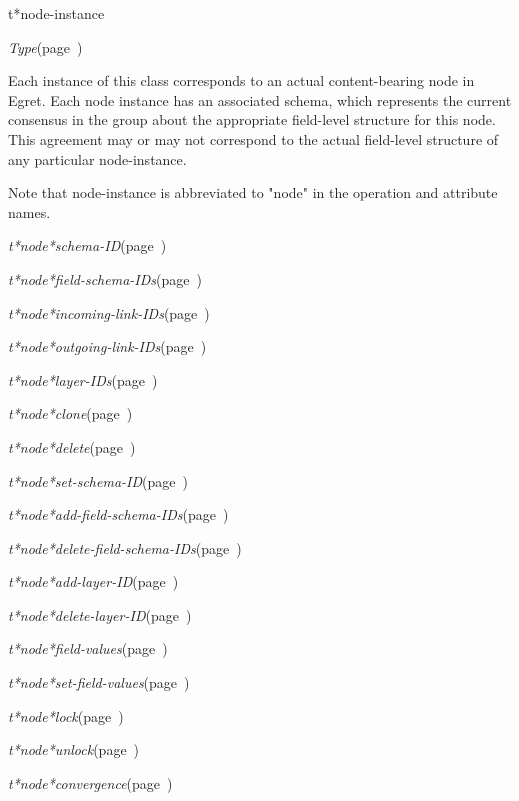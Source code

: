\begin{description}
\item [Name:]  t*node-instance

\item [Layer:] {\sl Type}\hfill(page~\pageref{Type})

\item [Description:]

Each instance of this class corresponds to an actual
content-bearing node in Egret.  Each node instance has
an associated schema, which represents the current
consensus in the group about the appropriate
field-level structure for this node.  This agreement
may or may not correspond to the actual field-level
structure of any particular node-instance.

Note that node-instance is abbreviated to "node" in
the operation and attribute names. 

\item [Attributes:]
\item {\sl t*node*schema-ID}\hfill(page~\pageref{t*node*schema-ID})
\item {\sl t*node*field-schema-IDs}\hfill(page~\pageref{t*node*field-schema-IDs})
\item {\sl t*node*incoming-link-IDs}\hfill(page~\pageref{t*node*incoming-link-IDs})
\item {\sl t*node*outgoing-link-IDs}\hfill(page~\pageref{t*node*outgoing-link-IDs})
\item {\sl t*node*layer-IDs}\hfill(page~\pageref{t*node*layer-IDs})

\item [Operations:]
\item {\sl t*node*clone}\hfill(page~\pageref{t*node*clone})
\item {\sl t*node*delete}\hfill(page~\pageref{t*node*delete})
\item {\sl t*node*set-schema-ID}\hfill(page~\pageref{t*node*set-schema-ID})
\item {\sl t*node*add-field-schema-IDs}\hfill(page~\pageref{t*node*add-field-schema-IDs})
\item {\sl t*node*delete-field-schema-IDs}\hfill(page~\pageref{t*node*delete-field-schema-IDs})
\item {\sl t*node*add-layer-ID}\hfill(page~\pageref{t*node*add-layer-ID})
\item {\sl t*node*delete-layer-ID}\hfill(page~\pageref{t*node*delete-layer-ID})
\item {\sl t*node*field-values}\hfill(page~\pageref{t*node*field-values})
\item {\sl t*node*set-field-values}\hfill(page~\pageref{t*node*set-field-values})
\item {\sl t*node*lock}\hfill(page~\pageref{t*node*lock})
\item {\sl t*node*unlock}\hfill(page~\pageref{t*node*unlock})
\item {\sl t*node*convergence}\hfill(page~\pageref{t*node*convergence})
 


\end{description}
